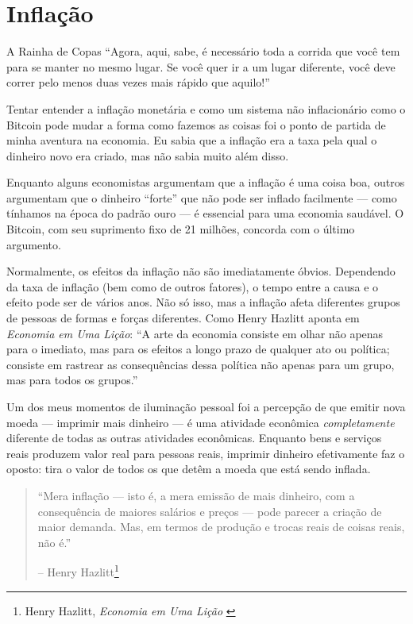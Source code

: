 \chapter{Inflação}
\label{les:9}

\begin{chapquote}{A Rainha de Copas} %
\enquote{Agora, aqui, sabe, é necessário toda a corrida que você tem para se manter no mesmo lugar. Se você quer ir a um lugar diferente, você deve correr pelo menos duas vezes mais rápido que aquilo!}
\end{chapquote}

Tentar entender a inflação monetária e como um sistema não inflacionário como o Bitcoin pode mudar a forma como fazemos as coisas foi o ponto de partida de minha aventura na economia. Eu sabia que a inflação era a taxa pela qual o dinheiro novo era criado, mas não sabia muito além disso.

Enquanto alguns economistas argumentam que a inflação é uma coisa boa, outros argumentam que o dinheiro \enquote{forte} que não pode ser inflado facilmente --- como tínhamos na época do padrão ouro --- é essencial para uma economia saudável. O Bitcoin, com seu suprimento fixo de 21 milhões, concorda com o último argumento.

Normalmente, os efeitos da inflação não são imediatamente óbvios. Dependendo da taxa de inflação (bem como de outros fatores), o tempo entre a causa e o efeito pode ser de vários anos. Não só isso, mas a inflação afeta diferentes grupos de pessoas de formas e forças diferentes. Como Henry Hazlitt aponta em \textit{Economia em Uma Lição}: \enquote{A arte da economia consiste em olhar não apenas para o imediato, mas para os efeitos a longo prazo de qualquer ato ou política; consiste em rastrear as consequências dessa política não apenas para um grupo, mas para todos os grupos.}

Um dos meus momentos de iluminação pessoal foi a percepção de que emitir nova moeda --- imprimir mais dinheiro --- é uma atividade econômica \textit{completamente} diferente de todas as outras atividades econômicas. Enquanto bens e serviços reais produzem valor real para pessoas reais, imprimir dinheiro efetivamente faz o oposto: tira o valor de todos os que detêm a moeda que está sendo inflada.

\begin{quotation}\begin{samepage}
\enquote{Mera inflação --- isto é, a mera emissão de mais dinheiro, com a consequência de maiores salários e preços --- pode parecer a criação de maior demanda. Mas, em termos de produção e trocas reais de coisas reais, não é.}
\begin{flushright} -- Henry Hazlitt\footnote{Henry Hazlitt, \textit{Economia em Uma Lição} \cite{hazlitt}}
\end{flushright}\end{samepage}\end{quotation}

